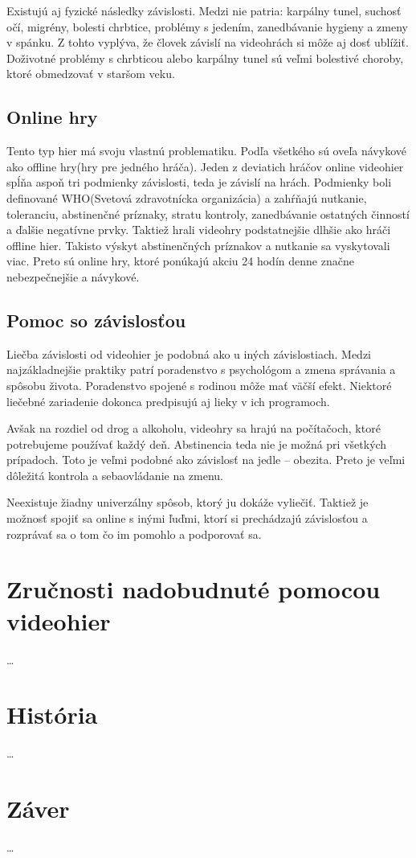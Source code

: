 \documentclass[10pt,oneside,slovak,a4paper]{article}
\begin{document}
Existujú aj fyzické následky závislosti. Medzi nie patria: karpálny tunel, suchosť očí, migrény, bolesti chrbtice, problémy s jedením, zanedbávanie hygieny a zmeny v spánku. Z tohto vyplýva, že človek závislí na videohrách si môže aj dosť ublížiť. Doživotné problémy s chrbticou alebo karpálny tunel sú veľmi bolestivé choroby, ktoré obmedzovať v staršom veku.

\subsection{Online hry}

Tento typ hier má svoju vlastnú problematiku. Podľa všetkého sú oveľa návykové ako offline hry(hry pre jedného hráča). Jeden z deviatich hráčov online videohier spĺňa aspoň tri podmienky závislosti, teda je závislí na hrách. Podmienky boli definované WHO(Svetová zdravotnícka organizácia) a zahŕňajú nutkanie, toleranciu, abstinenčné príznaky, stratu kontroly, zanedbávanie ostatných činností a ďalšie negatívne prvky. Taktiež hrali videohry podstatnejšie dlhšie ako hráči offline hier. Takisto výskyt abstinenčných príznakov a nutkanie sa vyskytovali viac. Preto sú online hry, ktoré ponúkajú akciu 24 hodín denne značne nebezpečnejšie a návykové. 
\subsection{Pomoc so závislosťou}

Liečba závislosti od videohier je podobná ako u iných závislostiach. Medzi najzákladnejšie praktiky patrí poradenstvo s psychológom a zmena správania a spôsobu života. Poradenstvo spojené s rodinou môže mať väčší efekt. Niektoré liečebné zariadenie dokonca predpisujú aj lieky v ich programoch. 

Avšak na rozdiel od drog a alkoholu, videohry sa hrajú na počítačoch, ktoré potrebujeme používať každý deň. Abstinencia teda nie je možná pri všetkých prípadoch.  Toto je veľmi podobné ako závislosť na jedle – obezita. Preto je veľmi dôležitá kontrola a sebaovládanie na zmenu. 

Neexistuje žiadny univerzálny spôsob, ktorý ju dokáže vyliečiť. Taktiež je možnosť spojiť sa online s inými ľuďmi, ktorí si prechádzajú závislosťou a rozprávať sa o tom čo im pomohlo a podporovať sa.  
\section{Zručnosti nadobudnuté pomocou videohier}
\dots
\section{História} \label{History}
\dots


\section{Záver} \label{zaver} %
\dots





\end{document}

